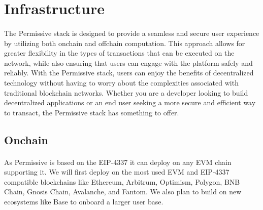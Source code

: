 \documentclass{article}
\begin{document}
\section{Infrastructure}
\paragraph{}
The Permissive stack is designed to provide a seamless and secure user experience by utilizing both onchain and offchain computation. This approach allows for greater flexibility in the types of transactions that can be executed on the network, while also ensuring that users can engage with the platform safely and reliably. With the Permissive stack, users can enjoy the benefits of decentralized technology without having to worry about the complexities associated with traditional blockchain networks. Whether you are a developer looking to build decentralized applications or an end user seeking a more secure and efficient way to transact, the Permissive stack has something to offer. 
\subsection{Onchain}
\paragraph{}
As Permissive is based on the EIP-4337 it can deploy on any EVM chain supporting it. We will first deploy on the most used EVM  and EIP-4337 compatible blockchains like Ethereum, Arbitrum, Optimism, Polygon, BNB Chain, Gnosis Chain, Avalanche, and Fantom. We also plan to build on new ecosystems like Base to onboard a larger user base.
\end{document}
